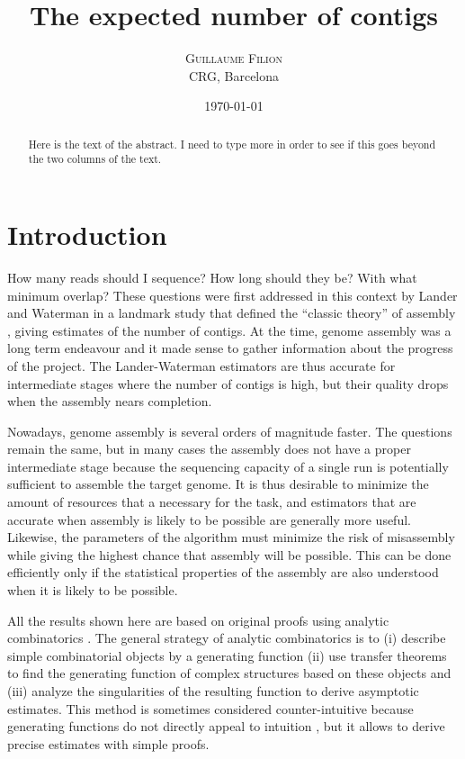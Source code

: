 \documentclass{article}
\title{The expected number of contigs}
\author{
\textsc{Guillaume Filion} \\ [1ex]
\normalsize CRG, Barcelona
}
\date{\today}
\begin{document}
\maketitle

\begin{abstract}
Here is the text of the abstract. I need to type more in order to see if
this goes beyond the two columns of the text.
\end{abstract}



\section{Introduction}

How many reads should I sequence? How long should they be? With what
minimum overlap? These questions were first addressed in this context by
Lander and Waterman in a landmark study that defined the ``classic
theory'' of assembly \cite{pmid3294162}, giving estimates of the number of
contigs. At the time, genome assembly was a long term endeavour and it
made sense to gather information about the progress of the project. The
Lander-Waterman estimators are thus accurate for intermediate stages where
the number of contigs is high, but their quality drops when the assembly
nears completion.

Nowadays, genome assembly is several orders of magnitude faster. The
questions remain the same, but in many cases the assembly does not have a
proper intermediate stage because the sequencing capacity of a single run
is potentially sufficient to assemble the target genome. It is thus
desirable to minimize the amount of resources that a necessary for the
task, and estimators that are accurate when assembly is likely to be
possible are generally more useful. Likewise, the parameters of the
algorithm must minimize the risk of misassembly while giving the highest
chance that assembly will be possible. This can be done efficiently only
if the statistical properties of the assembly are also understood when it
is likely to be possible.

All the results shown here are based on original proofs using analytic
combinatorics \cite{AnalComb2009}. The general strategy of analytic
combinatorics is to (i) describe simple combinatorial objects by a
generating function (ii) use transfer theorems to find the generating
function of complex structures based on these objects and (iii) analyze
the singularities of the resulting function to derive asymptotic
estimates. This method is sometimes considered counter-intuitive because
generating functions do not directly appeal to intuition
\cite{AnalComb1996}, but it allows to derive precise estimates with simple
proofs.
\end{document}
